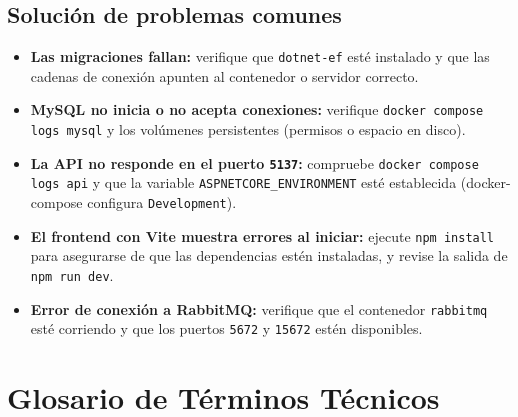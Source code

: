 \documentclass[12pt,letterpaper]{article}
\begin{document}
\subsection{Solución de problemas comunes}

\begin{itemize}
    \item \textbf{Las migraciones fallan:} verifique que \texttt{dotnet-ef} esté instalado y que las cadenas de conexión apunten al contenedor o servidor correcto.
    \item \textbf{MySQL no inicia o no acepta conexiones:} verifique \texttt{docker compose logs mysql} y los volúmenes persistentes (permisos o espacio en disco).
    \item \textbf{La API no responde en el puerto \texttt{5137}:} compruebe \texttt{docker compose logs api} y que la variable \texttt{ASPNETCORE\_ENVIRONMENT} esté establecida (docker-compose configura \texttt{Development}).
    \item \textbf{El frontend con Vite muestra errores al iniciar:} ejecute \texttt{npm install} para asegurarse de que las dependencias estén instaladas, y revise la salida de \texttt{npm run dev}.
    \item \textbf{Error de conexión a RabbitMQ:} verifique que el contenedor \texttt{rabbitmq} esté corriendo y que los puertos \texttt{5672} y \texttt{15672} estén disponibles.
\end{itemize}

\section{Glosario de Términos Técnicos}
\end{document}
